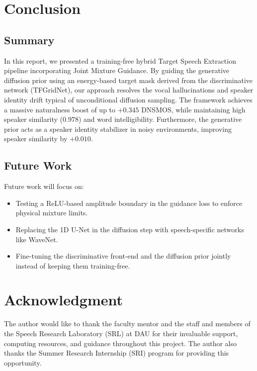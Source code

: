 \documentclass[conference]{IEEEtran}
\begin{document}
\section{Conclusion}

\subsection{Summary}
In this report, we presented a training-free hybrid Target Speech Extraction pipeline incorporating Joint Mixture Guidance. By guiding the generative diffusion prior using an energy-based target mask derived from the discriminative network (TFGridNet), our approach resolves the vocal hallucinations and speaker identity drift typical of unconditional diffusion sampling. The framework achieves a massive naturalness boost of up to $+0.345$ DNSMOS, while maintaining high speaker similarity ($0.978$) and word intelligibility. Furthermore, the generative prior acts as a speaker identity stabilizer in noisy environments, improving speaker similarity by $+0.010$.

\subsection{Future Work}
Future work will focus on:
\begin{itemize}
    \item Testing a ReLU-based amplitude boundary in the guidance loss to enforce physical mixture limits.
    \item Replacing the 1D U-Net in the diffusion step with speech-specific networks like WaveNet.
    \item Fine-tuning the discriminative front-end and the diffusion prior jointly instead of keeping them training-free.
\end{itemize}


\section*{Acknowledgment}
The author would like to thank the faculty mentor and the staff and members of the Speech Research Laboratory (SRL) at DAU for their invaluable support, computing resources, and guidance throughout this project. The author also thanks the Summer Research Internship (SRI) program for providing this opportunity.
\end{document}
